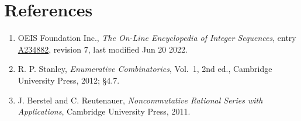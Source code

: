 \documentclass[11pt]{article}
\theoremstyle{definition}
\begin{document}
\section{References}

\begin{enumerate}

\item OEIS Foundation Inc., \emph{The On-Line Encyclopedia of Integer Sequences}, entry \href{https://oeis.org/A234882}{A234882}, revision 7, last modified Jun 20 2022.

\item R. P. Stanley, \emph{Enumerative Combinatorics}, Vol.~1, 2nd ed., Cambridge University Press, 2012; \S4.7.

\item J. Berstel and C. Reutenauer, \emph{Noncommutative Rational Series with Applications}, Cambridge University Press, 2011.

\end{enumerate}
\end{document}
